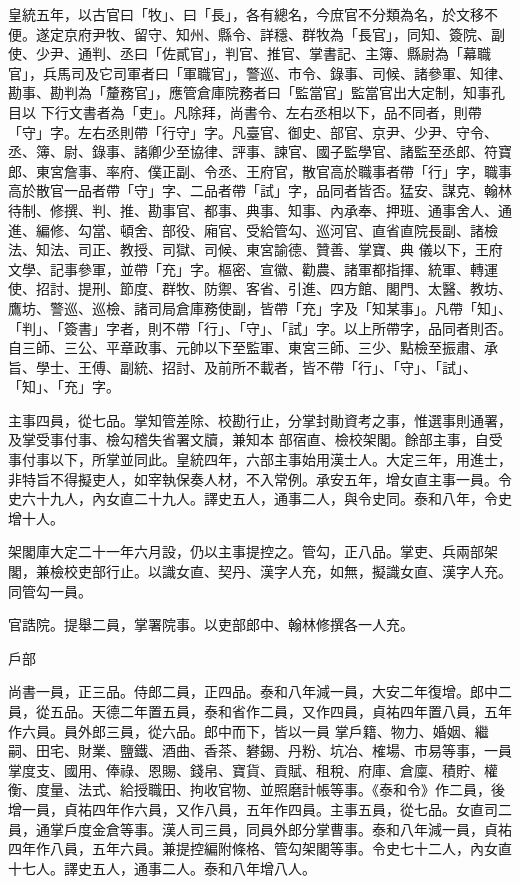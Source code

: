 \begin{pinyinscope}
 皇統五年，以古官曰「牧」、曰「長」，各有總名，今庶官不分類為名，於文移不便。遂定京府尹牧、留守、知州、縣令、詳穩、群牧為「長官」，同知、簽院、副使、少尹、通判、丞曰「佐貳官」，判官、推官、掌書記、主簿、縣尉為「幕職官」，兵馬司及它司軍者曰「軍職官」，警巡、市令、錄事、司候、諸參軍、知律、勘事、勘判為「釐務官」，應管倉庫院務者曰「監當官」監當官出大定制，知事孔目以
 下行文書者為「吏」。凡除拜，尚書令、左右丞相以下，品不同者，則帶「守」字。左右丞則帶「行守」字。凡臺官、御史、部官、京尹、少尹、守令、丞、簿、尉、錄事、諸卿少至協律、評事、諫官、國子監學官、諸監至丞郎、符寶郎、東宮詹事、率府、僕正副、令丞、王府官，散官高於職事者帶「行」字，職事高於散官一品者帶「守」字、二品者帶「試」字，品同者皆否。猛安、謀克、翰林待制、修撰、判、推、勘事官、都事、典事、知事、內承奉、押班、通事舍人、通進、編修、勾當、頓舍、部役、廂官、受給管勾、巡河官、直省直院長副、諸檢法、知法、司正、教授、司獄、司候、東宮諭德、贊善、掌寶、典
 儀以下，王府文學、記事參軍，並帶「充」字。樞密、宣徽、勸農、諸軍都指揮、統軍、轉運使、招討、提刑、節度、群牧、防禦、客省、引進、四方館、閣門、太醫、教坊、鷹坊、警巡、巡檢、諸司局倉庫務使副，皆帶「充」字及「知某事」。凡帶「知」、「判」、「簽書」字者，則不帶「行」、「守」、「試」字。以上所帶字，品同者則否。自三師、三公、平章政事、元帥以下至監軍、東宮三師、三少、點檢至振肅、承旨、學士、王傅、副統、招討、及前所不載者，皆不帶「行」、「守」、「試」、「知」、「充」字。



 主事四員，從七品。掌知管差除、校勘行止，分掌封勛資考之事，惟選事則通署，及掌受事付事、檢勾稽失省署文牘，兼知本
 部宿直、檢校架閣。餘部主事，自受事付事以下，所掌並同此。皇統四年，六部主事始用漢士人。大定三年，用進士，非特旨不得擬吏人，如宰執保奏人材，不入常例。承安五年，增女直主事一員。令史六十九人，內女直二十九人。譯史五人，通事二人，與令史同。泰和八年，令史增十人。



 架閣庫大定二十一年六月設，仍以主事提控之。管勾，正八品。掌吏、兵兩部架閣，兼檢校吏部行止。以識女直、契丹、漢字人充，如無，擬識女直、漢字人充。同管勾一員。



 官誥院。提舉二員，掌署院事。以吏部郎中、翰林修撰各一人充。



 戶部



 尚書一員，正三品。侍郎二員，正四品。泰和八年減一員，大安二年復增。郎中二員，從五品。天德二年置五員，泰和省作二員，又作四員，貞祐四年置八員，五年作六員。員外郎三員，從六品。郎中而下，皆以一員
 掌戶籍、物力、婚姻、繼嗣、田宅、財業、鹽鐵、酒曲、香茶、礬錫、丹粉、坑冶、榷場、市易等事，一員掌度支、國用、俸祿、恩賜、錢帛、寶貨、貢賦、租稅、府庫、倉廩、積貯、權衡、度量、法式、給授職田、拘收官物、並照磨計帳等事。《泰和令》作二員，後增一員，貞祐四年作六員，又作八員，五年作四員。主事五員，從七品。女直司二員，通掌戶度金倉等事。漢人司三員，同員外郎分掌曹事。泰和八年減一員，貞祐四年作八員，五年六員。兼提控編附條格、管勾架閣等事。令史七十二人，內女直十七人。譯史五人，通事二人。泰和八年增八人。




\end{pinyinscope}
